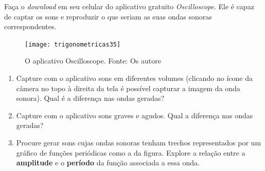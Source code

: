 \begin{knowledge}
Faça o \textit{download} em seu celular do aplicativo gratuito \textit{Oscilloscope}. Ele é capaz de captar os sons e reproduzir o que seriam as suas ondas sonoras correspondentes.

\begin{figure}[H]
\centering

\texttt{[image: trigonometricas35]}
\caption{O aplicativo Oscilloscope. Fonte: Os autore}
\label{}
\end{figure}

\begin{enumerate}
\item Capture com o aplicativo sons em diferentes volumes (clicando no ícone da câmera no topo à direita da tela é possível capturar a imagem da onda sonora). Qual é a diferença nas ondas geradas?
\item Capture com o aplicativo sons graves e agudos. Qual a diferença nas ondas geradas?
\item Procure gerar sons cujas ondas sonoras tenham trechos representados por um gráfico de funções periódicas como a da figura. Explore a relação entre a \textbf{amplitude} e o \textbf{período} da função associada a essa onda.

\end{enumerate}

\end{knowledge}



